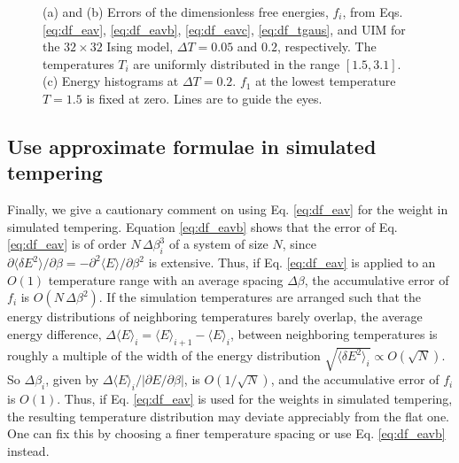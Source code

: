 \documentclass[aip,jcp,preprint,notitlepage, superscriptaddress]{revtex4-1}
\begin{document}
\begin{figure}[h]
  \caption{
    \label{fig:is2approx}
    (a) and (b) Errors of the dimensionless free energies, $f_i$,
    from Eqs. \eqref{eq:df_eav}, \eqref{eq:df_eavb}, \eqref{eq:df_eavc},
    \eqref{eq:df_tgaus},
    and UIM for the $32\times 32$ Ising model,
    $\Delta T = 0.05$ and $0.2$, respectively.
    The temperatures $T_i$ are uniformly distributed
    in the range $[1.5, 3.1]$.
    (c) Energy histograms at $\Delta T = 0.2$.
    $f_1$ at the lowest temperature $T = 1.5$ is fixed at zero.
    Lines are to guide the eyes.
  }
\end{figure}





\subsection{Use approximate formulae in simulated tempering}



Finally, we give a cautionary comment
on using Eq. \eqref{eq:df_eav}
for the weight in simulated tempering\cite{park2007}.
%
Equation \eqref{eq:df_eavb} shows that
the error of Eq. \eqref{eq:df_eav}
is of order $N \, \Delta \beta_i^3$
of a system of size $N$,
since
$\partial \langle \delta E^2 \rangle / \partial \beta
= -\partial^2 \langle E \rangle / \partial \beta^2$
is extensive.
%
Thus,
if Eq. \eqref{eq:df_eav} is applied to
an $O(1)$ temperature range
with an average spacing $\Delta \beta$,
the accumulative error of $f_i$
is $O(N \, \Delta \beta^2)$.
%
If the simulation temperatures
are arranged
such that the energy distributions
of neighboring temperatures
barely overlap,
%
the average energy difference,
$\Delta \langle E \rangle_i = \langle E \rangle_{i+1} - \langle E \rangle_i$,
between neighboring temperatures
is roughly a multiple of the width of
the energy distribution
$\sqrt{ \langle \delta E^2 \rangle_i } \propto O(\sqrt{N})$.
%
So $\Delta \beta_i$,
given by $\Delta \langle E \rangle_i / |\partial E/\partial \beta|$,
is $O(1/\sqrt{N})$,
%
and the accumulative error
of $f_i$ is $O(1)$.
%
Thus, if Eq. \eqref{eq:df_eav}
is used for the weights
in simulated tempering\cite{park2007},
the resulting temperature distribution
may deviate appreciably
from the flat one.
%
One can fix this by choosing
a finer temperature spacing or
use Eq. \eqref{eq:df_eavb}
instead.




\end{document}
